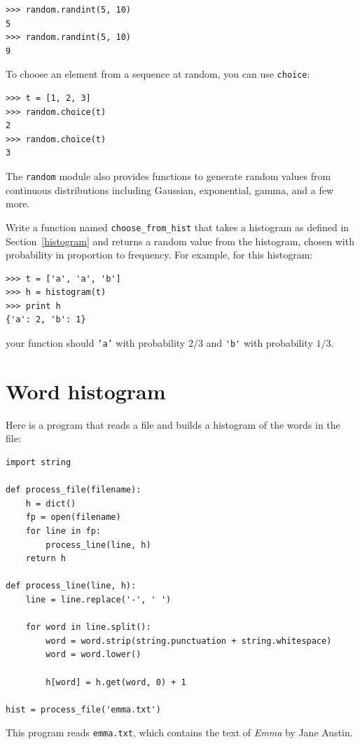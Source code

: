 \documentclass[10pt]{book}
\begin{document}

\beforeverb
\begin{verbatim}
>>> random.randint(5, 10)
5
>>> random.randint(5, 10)
9
\end{verbatim}
\afterverb
%
To choose an element from a sequence at random, you can use
{\tt choice}:


\beforeverb
\begin{verbatim}
>>> t = [1, 2, 3]
>>> random.choice(t)
2
>>> random.choice(t)
3
\end{verbatim}
\afterverb
%
The {\tt random} module also provides functions to generate
random values from continuous distributions including
Gaussian, exponential, gamma, and a few more.

\begin{ex}


Write a function named \verb"choose_from_hist" that takes
a histogram as defined in Section~\ref{histogram} and returns a 
random value from the histogram, chosen with probability
in proportion to frequency.  For example, for this histogram:

\beforeverb
\begin{verbatim}
>>> t = ['a', 'a', 'b']
>>> h = histogram(t)
>>> print h
{'a': 2, 'b': 1}
\end{verbatim}
\afterverb
%
your function should {\tt 'a'} with probability $2/3$ and \verb"'b'"
with probability $1/3$.
\end{ex}


\section{Word histogram}

Here is a program that reads a file and builds a histogram of the
words in the file:


\beforeverb
\begin{verbatim}
import string

def process_file(filename):
    h = dict()
    fp = open(filename)
    for line in fp:
        process_line(line, h)
    return h

def process_line(line, h):
    line = line.replace('-', ' ')
    
    for word in line.split():
        word = word.strip(string.punctuation + string.whitespace)
        word = word.lower()

        h[word] = h.get(word, 0) + 1

hist = process_file('emma.txt')
\end{verbatim}
\afterverb
%
This program reads {\tt emma.txt}, which contains the text of {\em
  Emma} by Jane Austin.
\end{document}
